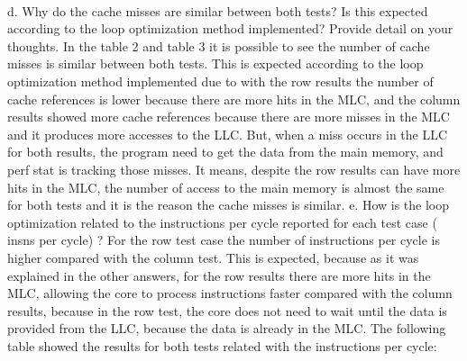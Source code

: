 \documentclass[xcolor=table]{llncs}
\begin{document}
\paragraph{}
d. Why do the cache misses are similar between both tests? Is this expected according to the loop optimization method implemented? Provide detail on your thoughts.\newline
In the table 2 and table 3 it is possible to see the number of cache misses is similar between both tests. This is expected according to the loop optimization method implemented due to with the row results the number of cache references is lower because there are more hits in the MLC, and the column results showed more cache references because there are more misses in the MLC and it produces more accesses to the LLC. But, when a miss occurs in the LLC for both results, the program need to get the data from the main memory, and perf stat is tracking those misses. It means, despite the row results can have more hits in the MLC, the number of access to the main memory is almost the same for both tests and it is the reason the cache misses is similar.\newline
e. How is the loop optimization related to the instructions per cycle reported for each test case ( insns per cycle) ?\newline
For the row test case the number of instructions per cycle is higher compared with the column test. This is expected, because as it was explained in the other answers, for the row results there are more hits in the MLC, allowing the core to process instructions faster compared with the column results, because in the row test, the core does not need to wait until the data is provided from the LLC, because the data is already in the MLC.
The following table showed the results for both tests related with the instructions per cycle:
\end{document}
